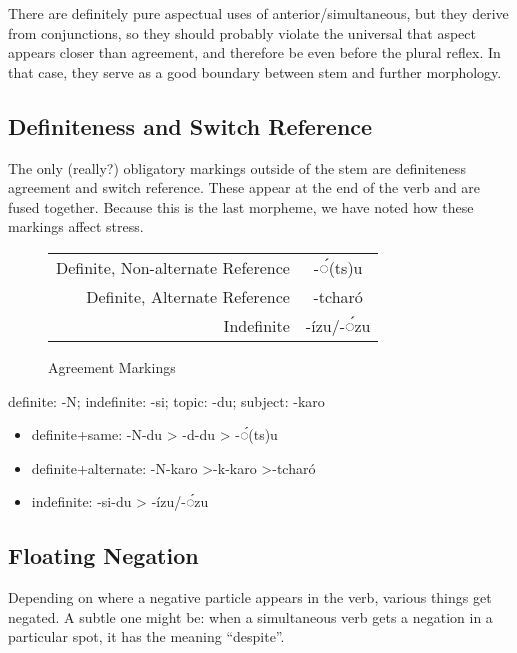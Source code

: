 \documentclass[12pt]{book} %
\begin{document}
{\color{green}
There are definitely pure aspectual uses of anterior/simultaneous, but they derive from conjunctions, so they should probably violate the universal that aspect appears closer than agreement, and therefore be even before the plural reflex. In that case, they serve as a good boundary between stem and further morphology.
}

\subsection{Definiteness and Switch Reference}

The {\color{red}only (really?)} obligatory markings outside of the stem are definiteness agreement and switch reference.
These appear at the end of the verb and are fused together.
Because this is the last morpheme, we have noted how these markings affect stress.

\begin{figure}[H]
\centering
    \begin{tabular}{rc}
        Definite, Non-alternate Reference   & -◌́(ts)u      \\
        Definite, Alternate Reference       & -tcharó       \\
        Indefinite                      & -ízu/-◌́zu    \\
    \end{tabular}
\caption{Agreement Markings}\label{t:agreement}
\end{figure}


{\color{green}
definite: -N; indefinite: -si;
topic: -du; subject: -karo
\begin{itemize}
\item definite+same: -N-du > -d-du > -◌́(ts)u
\item definite+alternate: -N-karo >-k-karo >-tcharó
\item indefinite: -si-du > -ízu/-◌́zu\
\end{itemize}
}




\subsection{Floating Negation}
{\color{orange}
Depending on where a negative particle appears in the verb, various things get negated.
A subtle one might be: when a simultaneous verb gets a negation in a particular spot, it has the meaning ``despite''.
}

 
\end{document}

